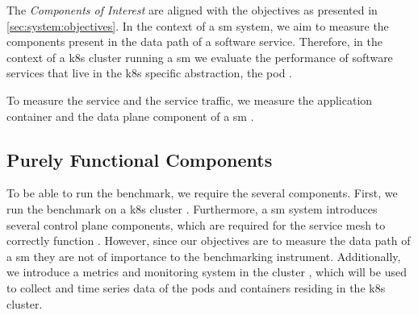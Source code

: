 The \textit{Components of Interest} are aligned with the objectives as presented in \cref{sec:system:objectives}. In the context of a \gls{sm} system, we aim to measure the components present in the data path of a software service. Therefore, in the context of a \gls{k8s} cluster running a \gls{sm} we evaluate the performance of software services that live in the \gls{k8s} specific abstraction, the \gls{pod} .

To measure the service and the service traffic, we measure the application container  and the data plane component of a \gls{sm} .

\subsection{Purely Functional Components}
\label{sec:system:sut:components-functional}

To be able to run the benchmark, we require the several components. First, we run the benchmark on a \gls{k8s} cluster . Furthermore, a \gls{sm} system introduces several control plane components, which are required for the service mesh to correctly function . However, since our objectives are to measure the data path of a \gls{sm} they are not of importance to the benchmarking instrument. Additionally, we introduce a metrics and monitoring system in the cluster , which will be used to collect and time series data of the pods and containers residing in the \gls{k8s} cluster.